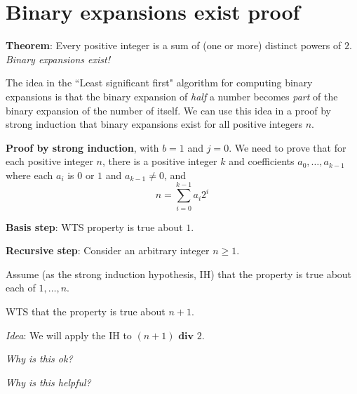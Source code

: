 \documentclass[12pt, oneside]{article}
\begin{document}
\section*{Binary expansions exist proof}


{\bf Theorem}: Every positive integer is a sum of (one or more) distinct powers of $2$.
{\it Binary expansions exist!}




The idea in the ``Least significant first" algorithm 
for computing binary expansions is that the binary
expansion of {\it half} a number becomes {\it part} of the binary expansion of 
the number of itself. We can use this 
idea in a proof by strong induction that binary expansions exist for all 
positive integers $n$.


{\bf Proof by strong induction}, with $b=1$ and $j=0$. We need to prove
that for each positive integer $n$, there is 
a positive integer $k$ and coefficients $a_0, \ldots, a_{k-1}$ 
where each $a_i$ is $0$ or $1$ and $a_{k-1} \neq 0$, and 
\[
n = \sum_{i=0}^{k-1} a_i 2^i
\]



{\bf Basis step}:  WTS property is true about  $1$.

\phantom{Choose $a_0 = 1$, then $(a_0)_2 = 1 \cdot 2^0 = 1$.}
\vspace{80pt}


{\bf Recursive step}: Consider an arbitrary integer $n \geq 1$.

Assume (as the strong induction hypothesis, IH) that the property is true about  each of $1, \ldots, n$.  

WTS that the property is true about $n+1$.

{\it Idea}: We will apply the IH to $(n+1) \textbf{ div } 2$.

{\it Why is this ok?}


\vfill
\newpage
{\it Why is this helpful?}
\end{document}
